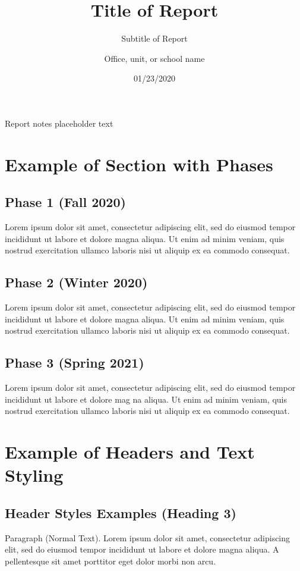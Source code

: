 \documentclass{nyu22report}
\title{Title of Report}
\subtitle{Subtitle of Report}
\author{Office, unit, or school name}
\date{01/23/2020}
\begin{document}
\maketitle
Report notes placeholder text

\tableofcontents

\chapter{Example of Section with Phases}

\section*{Phase 1 (Fall 2020)}
Lorem ipsum dolor sit amet, consectetur adipiscing elit, sed do eiusmod tempor
incididunt ut labore et dolore magna aliqua. Ut enim ad minim veniam, quis
nostrud exercitation ullamco laboris nisi ut aliquip ex ea commodo consequat.

\section*{Phase 2 (Winter 2020)}

Lorem ipsum dolor sit amet, consectetur adipiscing elit, sed do eiusmod tempor
incididunt ut labore et dolore magna aliqua. Ut enim ad minim veniam, quis
nostrud exercitation ullamco laboris nisi ut aliquip ex ea commodo consequat.

\section*{Phase 3 (Spring 2021)}

Lorem ipsum dolor sit amet, consectetur adipiscing elit, sed do eiusmod tempor
incididunt ut labore et dolore mag  na aliqua. Ut enim ad minim veniam, quis
nostrud exercitation ullamco laboris nisi ut aliquip ex ea commodo consequat.


\chapter{Example of Headers and Text Styling}

\section{Header Styles Examples (Heading 3)}

Paragraph (Normal Text). Lorem ipsum dolor sit amet, consectetur adipiscing
elit, sed do eiusmod tempor incididunt ut labore et dolore magna aliqua. A
pellentesque sit amet porttitor eget dolor morbi non arcu.
\end{document}
